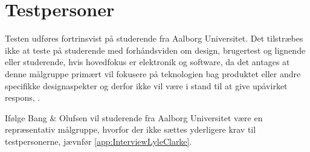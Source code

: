 \section{Testpersoner}
\label{TestpersonerValgAfGestikker}
%
Testen udføres fortrinsvist på studerende fra Aalborg Universitet. Det tilstræbes ikke at teste på studerende med forhåndsviden om design, brugertest og lignende eller studerende, hvis hovedfokus er elektronik og software, da det antages at denne målgruppe primært vil fokusere på teknologien bag produktet eller andre specifikke designaspekter og derfor ikke vil være i stand til at give upåvirket respons, \parencite[s. 110]{Book:OUE}. 

Ifølge Bang $\&$ Olufsen vil studerende fra Aalborg Universitet være en repræsentativ målgruppe, hvorfor der ikke sættes yderligere krav til testpersonerne, jævnfør \autoref{app:InterviewLyleClarke}.  
%
